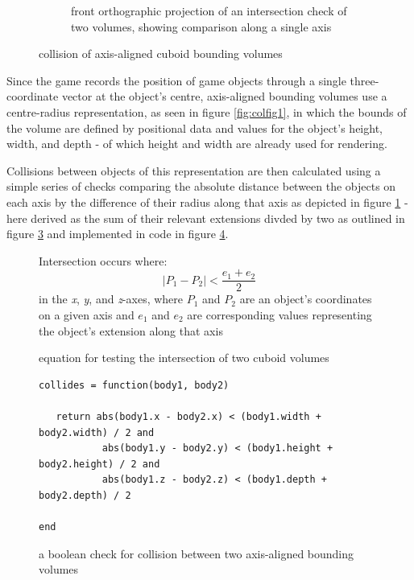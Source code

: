\documentclass{article}
\begin{document}
\begin{figure}[h]
\begin{subfigure}{.45\textwidth}
   \caption{front orthographic projection of an intersection check of two volumes, showing comparison along a single axis}
   \label{fig:colfig2}
\end{subfigure}\hfill
\caption{collision of axis-aligned cuboid bounding volumes}
\label{fig:collision}
\end{figure}

Since the game records the position of game objects through a single three-coordinate vector at the object's
centre, axis-aligned bounding volumes use a centre-radius representation\cite[p. 78]{ericson}, as seen in
figure \ref{fig:colfig1}, in which the bounds of the volume are defined by positional data and values for the
object's height, width, and depth - of which height and width are already used for rendering.

Collisions between objects of this representation are then calculated using a simple series of checks comparing
the absolute distance between the objects on each axis by the difference of their radius along that axis as
depicted in figure \ref{fig:colfig2} - here derived as the sum of their relevant extensions divded by two as
outlined in figure \ref{fig:colequation} and implemented in code in figure \ref{fig:codecollide}.

\begin{figure}
   \centering
   Intersection occurs where:
   \begin{equation}
      |P_1 - P_2| < \frac{e_1 + e_2} {2}
   \end{equation}
   in the \textit{x}, \textit{y}, and \textit{z}-axes, where $P_1$ and $P_2$ are an object's coordinates on a given axis and
   $e_1$ and $e_2$ are corresponding values representing the object's extension along that axis
   \caption{equation for testing the intersection of two cuboid volumes}
   \label{fig:colequation}
\end{figure}

\begin{figure}[h]
   \begin{lstlisting}
collides = function(body1, body2)

   return abs(body1.x - body2.x) < (body1.width + body2.width) / 2 and
           abs(body1.y - body2.y) < (body1.height + body2.height) / 2 and
           abs(body1.z - body2.z) < (body1.depth + body2.depth) / 2

end
   \end{lstlisting}
   \caption{a boolean check for collision between two axis-aligned bounding volumes}
   \label{fig:codecollide}
\end{figure}
\end{document}
